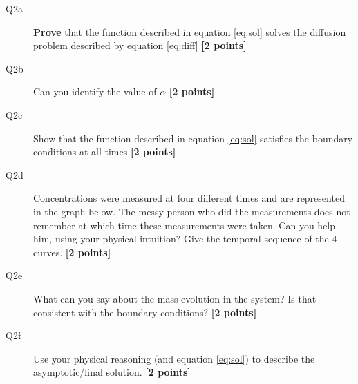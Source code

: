 \documentclass{article}
\begin{document}
\begin{description}
\item [Q2a] \textbf{Prove} that the function described in equation \ref{eq:sol} solves the diffusion problem described by equation \ref{eq:diff} \textbf{[2 points]}
\vspace{2cm}

\item [Q2b] Can you identify the value of $\alpha$ \textbf{[2 points]}
\vspace{2cm}

\item [Q2c] Show that the function described in equation \ref{eq:sol} satisfies the boundary conditions at all times \textbf{[2 points]}
\vspace{2cm}

\item [Q2d] Concentrations were measured at four different times and are represented in the graph below. The messy person who did the measurements does not remember at which time these measurements were taken. Can you help him, using your physical intuition? Give the temporal sequence of the 4 curves.  \textbf{[2 points]}
\end{description}



\begin{description}
\item [Q2e] What can you say about the mass evolution in the system? Is that consistent with the boundary conditions? \textbf{[2 points]}
\vspace{2cm}

\item [Q2f] Use your physical reasoning (and equation \ref{eq:sol}) to describe the asymptotic/final solution. \textbf{[2 points]}
\vspace{2cm}

\end{description}
\end{document}
